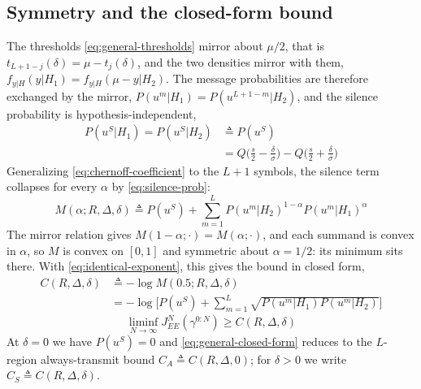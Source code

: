 \documentclass[conference]{IEEEtran}
\newcommand{\Qfun}{Q}
\begin{document}
\subsection{Symmetry and the closed-form bound}
The thresholds \eqref{eq:general-thresholds} mirror about $\mu/2$, that is
$t_{L+1-j}(\delta)=\mu-t_j(\delta)$, and the two densities mirror with them,
$f_{y|H}(y|H_1)=f_{y|H}(\mu-y|H_2)$.  The message probabilities are
therefore exchanged by the mirror, $P(u^m|H_1)=P(u^{L+1-m}|H_2)$, and the
silence probability is hypothesis-independent,
\begin{align}
 P(u^S|H_1)=P(u^S|H_2)&\triangleq P(u^S)\nonumber\\
 &=\Qfun\Big(\frac{s}{2}-\frac{\delta}{\sigma}\Big)
 -\Qfun\Big(\frac{s}{2}+\frac{\delta}{\sigma}\Big)
 \label{eq:silence-prob}
\end{align}
Generalizing \eqref{eq:chernoff-coefficient} to the $L+1$ symbols, the
silence term collapses for every $\alpha$ by \eqref{eq:silence-prob}:
\begin{equation*}
 M(\alpha;R,\Delta,\delta)\triangleq P(u^S)
 +\sum_{m=1}^{L}P(u^m|H_2)^{1-\alpha}P(u^m|H_1)^{\alpha}
\end{equation*}
The mirror relation gives $M(1-\alpha;\cdot)=M(\alpha;\cdot)$, and each
summand is convex in $\alpha$, so $M$ is convex on $[0,1]$ and symmetric
about $\alpha=1/2$: its minimum sits there.  With
\eqref{eq:identical-exponent}, this gives the bound in closed form,
\begin{align}
 C(R,\Delta,\delta)&\triangleq-\log M(0.5;R,\Delta,\delta)\nonumber\\
 &=-\log\Big[P(u^S)+\sum_{m=1}^{L}\sqrt{P(u^m|H_1)P(u^m|H_2)}\Big]
 \label{eq:general-closed-form}
\end{align}
\begin{equation}
 \liminf_{N\to\infty}J^N_{EE}(\gamma^{0:N})\ge C(R,\Delta,\delta)
 \label{eq:general-closed-form-bound}
\end{equation}
At $\delta=0$ we have $P(u^S)=0$ and \eqref{eq:general-closed-form} reduces
to the $L$-region always-transmit bound $C_A\triangleq C(R,\Delta,0)$; for
$\delta>0$ we write $C_S\triangleq C(R,\Delta,\delta)$.
\end{document}
